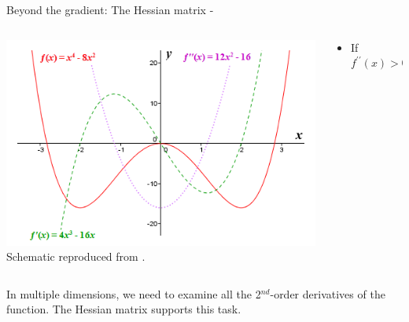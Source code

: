 \begin{frame}[t,allowframebreaks]{
    Beyond the gradient: The Hessian matrix -}
    \begin{columns}
        \begin{column}{0.60\textwidth}        
            \begin{center}
                \includegraphics[width=1.00\textwidth]
                    {./images/grad_descent/techuk_second_derivative_test_1.png}\\
                {\tiny 
                    \color{col:attribution} 
                    Schematic reproduced from \cite{TechUK:2ndDerivativeTest}.\\
                }
            \end{center}        
        \end{column}
        \begin{column}{0.40\textwidth}
            \begin{itemize}
                \item If $f^{\prime \prime}(x) > 0$
            \end{itemize}
                
        \end{column}
    \end{columns}

    \vspace{0.1cm}
    In multiple dimensions, 
    we need to examine all the 2$^{nd}$-order derivatives
    of the function. The \gls{Hessian matrix} supports this task.\\

    \framebreak



\end{frame}
